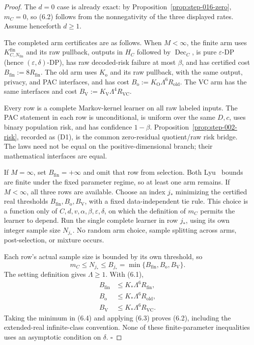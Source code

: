 \begin{proof}
The \(d=0\) case is already exact: by
Proposition~\ref{prop:step-016-zero}, \(m_C=0\), so (6.2) follows from the
nonnegativity of the three displayed rates. Assume henceforth \(d\ge1\).

The completed arm certificates are as follows. When \(M<\infty\), the finite
arm uses \(K^{\mathrm{fin}}_{C,N_{\mathrm{fin}}}\) and its raw pullback,
outputs in \(H_C\) followed by \(\operatorname{Dec}_C\), is pure
\(\varepsilon\)-DP (hence \((\varepsilon,\delta)\)-DP), has raw decoded-risk
failure at most \(\beta\), and has certified cost
\(B_{\mathrm{fin}}:=8R_{\mathrm{fin}}\). The old arm uses \(K_{\mathrm o}\)
and its raw pullback, with the same output, privacy, and PAC interfaces, and
has cost \(B_{\mathrm o}:=K_{\mathrm O}\Lambda^6R_{\mathrm{old}}\). The
VC arm has the same interfaces and cost
\(B_{\mathrm V}:=K_{\mathrm V}\Lambda^4R_{\mathrm{VC}}\).

Every row is a complete Markov-kernel learner on all raw labeled inputs. The
PAC statement in each row is unconditional, is uniform over the same
\(D,c\), uses binary population risk, and has confidence \(1-\beta\).
Proposition~\ref{prop:step-002-risk}, recorded as (D1), is the
common zero-residual quotient/raw risk bridge. The laws need not be equal on
the positive-dimensional branch; their mathematical interfaces are equal.

If \(M=\infty\), set \(B_{\mathrm{fin}}=+\infty\) and omit that row from
selection. Both Lyu~\citep{lyu2025} bounds are finite under the fixed parameter regime, so at
least one arm remains. If \(M<\infty\), all three rows are available. Choose
an index \(j_*\) minimizing the certified real thresholds
\(B_{\mathrm{fin}},B_{\mathrm o},B_{\mathrm V}\), with a fixed
data-independent tie rule. This choice is a function only of
\(C,d,v,\alpha,\beta,\varepsilon,\delta\), on which the definition of
\(m_C\) permits the learner to depend. Run the single complete learner in
row \(j_*\), using its own integer sample size \(N_{j_*}\). No random arm
choice, sample splitting across arms, post-selection, or mixture occurs.

Each row's actual sample size is bounded by its own threshold, so
\[
m_C\le N_{j_*}\le B_{j_*}
=\min\{B_{\mathrm{fin}},B_{\mathrm o},B_{\mathrm V}\}.
\tag{6.3}
\]
The setting definition gives \(\Lambda\ge1\). With (6.1),
\[
\begin{aligned}
B_{\mathrm{fin}}&\le K_*\Lambda^6R_{\mathrm{fin}},\\
B_{\mathrm o}&\le K_*\Lambda^6R_{\mathrm{old}},\\
B_{\mathrm V}&\le K_*\Lambda^6R_{\mathrm{VC}}.
\end{aligned}
\tag{6.4}
\]
Taking the minimum in (6.4) and applying (6.3) proves (6.2), including the
extended-real infinite-class convention. None of these finite-parameter
inequalities uses an asymptotic condition on \(\delta\). \(\square\)


\end{proof}

